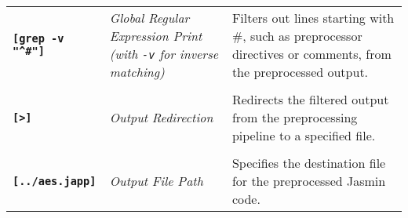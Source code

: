 \begin{table}[h!]
\begin{tabularx}{\textwidth}{>{\raggedleft\arraybackslash}p{}>{\centering\arraybackslash}p{}p{}}
\textbf{\texttt{[grep -v "\^{}\#"]}} & \textit{Global Regular Expression Print (with \texttt{-v} for inverse matching)}& Filters out lines starting with \#, such as preprocessor directives or comments, from the preprocessed output. \\ \\
\textbf{\texttt{[>]}} & \textit{Output Redirection} & Redirects the filtered output from the preprocessing pipeline to a specified file. \\ \\
\textbf{\texttt{[../aes.japp]}} & \textit{Output File Path} & Specifies the destination file for the preprocessed Jasmin code.
\end{tabularx}
\end{table}
	

